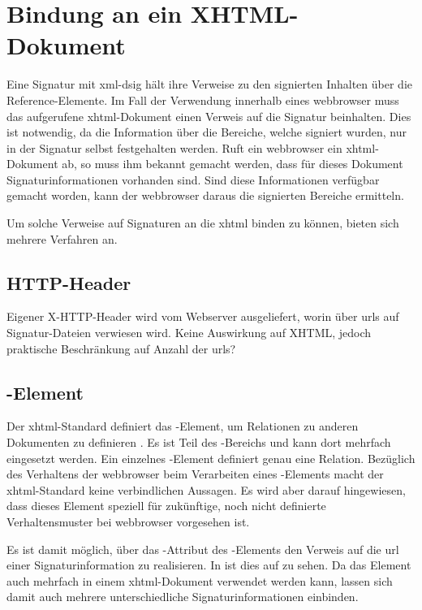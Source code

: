 \section{Bindung an ein XHTML-Dokument}
Eine Signatur mit \gls{xml-dsig} hält ihre Verweise zu den signierten Inhalten über die Reference-Elemente. Im Fall der Verwendung innerhalb eines
\gls{webbrowser} muss das aufgerufene \gls{xhtml}-Dokument einen Verweis auf die Signatur beinhalten. Dies ist notwendig, da die Information über die Bereiche,
welche signiert wurden, nur in der Signatur selbst festgehalten werden. Ruft ein \gls{webbrowser} ein \gls{xhtml}-Dokument ab, so muss ihm bekannt gemacht
werden, dass für dieses Dokument Signaturinformationen vorhanden sind. Sind diese Informationen verfügbar gemacht worden, kann der \gls{webbrowser} daraus die
signierten Bereiche ermitteln.

Um solche Verweise auf Signaturen an die \gls{xhtml} binden zu können, bieten sich mehrere Verfahren an.

\subsection{HTTP-Header}
Eigener X-HTTP-Header wird vom Webserver ausgeliefert, worin über \glspl{url} auf Signatur-Dateien verwiesen wird. Keine Auswirkung auf XHTML, jedoch praktische Beschränkung
auf Anzahl der \glspl{url}?

\subsection{-Element}
Der \gls{xhtml}-Standard definiert das -Element, um Relationen zu anderen Dokumenten zu definieren \cite{xhtml:oreilly}. Es ist Teil des
-Bereichs und kann dort mehrfach eingesetzt werden. Ein einzelnes -Element definiert genau eine Relation. Bezüglich des Verhaltens
der \gls{webbrowser} beim Verarbeiten eines -Elements macht der \gls{xhtml}-Standard keine verbindlichen Aussagen. Es wird aber darauf
hingewiesen, dass dieses Element speziell für zukünftige, noch nicht definierte Verhaltensmuster bei \gls{webbrowser} vorgesehen ist.

Es ist damit möglich, über das -Attribut des -Elements den Verweis auf die \gls{url} einer Signaturinformation zu realisieren. In
 ist dies auf  zu sehen. Da das
Element auch mehrfach in einem \gls{xhtml}-Dokument verwendet werden kann, lassen sich damit auch mehrere unterschiedliche Signaturinformationen einbinden.

